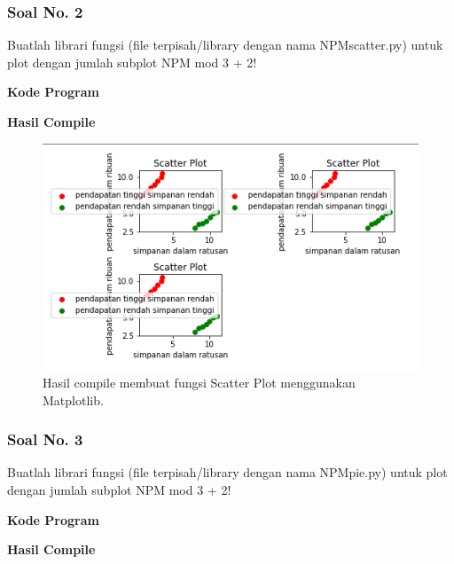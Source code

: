 \subsubsection{Soal No. 2}
\hfill \break
Buatlah librari fungsi (file terpisah/library dengan nama NPMscatter.py) untuk plot dengan jumlah subplot NPM mod 3 + 2!

\hfill \break
\textbf{Kode Program}



\hfill \break
\textbf{Hasil Compile}

\begin{figure}[H]
	\includegraphics[width=12cm]{figures/6/Praktek/1174051/p2.png}
	\centering
	\caption{Hasil compile membuat fungsi Scatter Plot menggunakan Matplotlib.}
\end{figure}

\subsubsection{Soal No. 3}
\hfill \break
Buatlah librari fungsi (file terpisah/library dengan nama NPMpie.py) untuk plot dengan jumlah subplot NPM mod 3 + 2!

\hfill \break
\textbf{Kode Program}



\hfill \break
\textbf{Hasil Compile}


